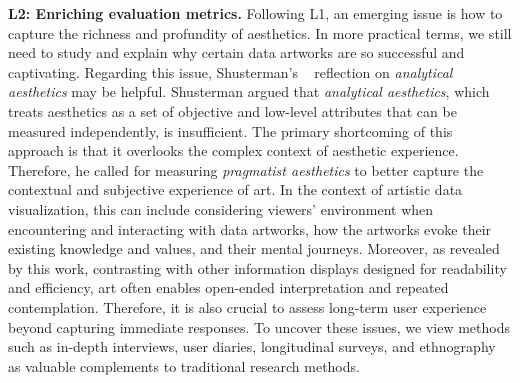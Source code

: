

\textbf{L2: Enriching evaluation metrics.} 
Following L1, an emerging issue is how to capture the richness and profundity of aesthetics. In more practical terms, we still need to study and explain why certain data artworks are so successful and captivating. Regarding this issue, Shusterman's ~\cite{shusterman2000pragmatist} reflection on \textit{analytical aesthetics} may be helpful. Shusterman argued that \textit{analytical aesthetics}, which treats aesthetics as a set of objective and low-level attributes that can be measured independently, is insufficient. The primary shortcoming of this approach is that it overlooks the complex context of aesthetic experience. Therefore, he called for measuring \textit{pragmatist aesthetics} to better capture the contextual and subjective experience of art. In the context of artistic data visualization, this can include considering viewers' environment when encountering and interacting with data artworks, how the artworks evoke their existing knowledge and values, and their mental journeys. Moreover, as revealed by this work, contrasting with other information displays designed for readability and efficiency, art often enables open-ended interpretation and repeated contemplation. Therefore, it is also crucial to assess long-term user experience beyond capturing immediate responses. To uncover these issues, we view methods such as in-depth interviews, user diaries, longitudinal surveys, and ethnography as valuable complements to traditional research methods.

